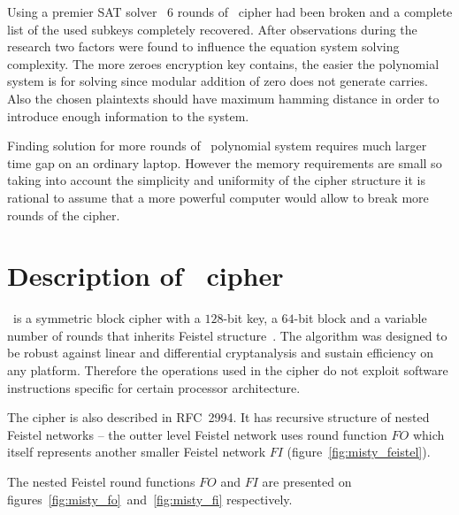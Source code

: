 Using a premier SAT solver~\cite{soos:cryptominisat} $6$ rounds of \gost\ cipher
had been broken and a complete list of the used subkeys completely recovered.
After observations during the research two factors were found to influence the
equation system solving complexity. The more zeroes encryption key contains, the
easier the polynomial system is for solving since modular addition of zero does
not generate carries. Also the chosen plaintexts should have maximum hamming
distance in order to introduce enough information to the system.

Finding solution for more rounds of \gost\ polynomial system requires
much larger time gap on an ordinary laptop. However the memory requirements are
small so taking into account the simplicity and uniformity of the cipher
structure it is rational to assume that a more powerful computer would allow to
break more rounds of the cipher.


\section{Description of \misty\ cipher}

\misty\ is a symmetric block cipher with a $128$-bit key, a $64$-bit block
and a variable number of rounds that inherits Feistel
structure~\cite{matsui1997new}. The algorithm was designed to be robust against
linear and differential cryptanalysis and sustain efficiency on any platform.
Therefore the operations used in the cipher do not exploit software instructions
specific for certain processor architecture.

The cipher is also described in RFC~2994. It has recursive structure of nested
Feistel networks -- the outter level Feistel network uses round function $FO$
which itself represents another smaller Feistel network $FI$
(figure~\ref{fig:misty_feistel}).

The nested Feistel round functions $FO$ and $FI$ are presented on
figures~\ref{fig:misty_fo}~and~\ref{fig:misty_fi} respectively.

